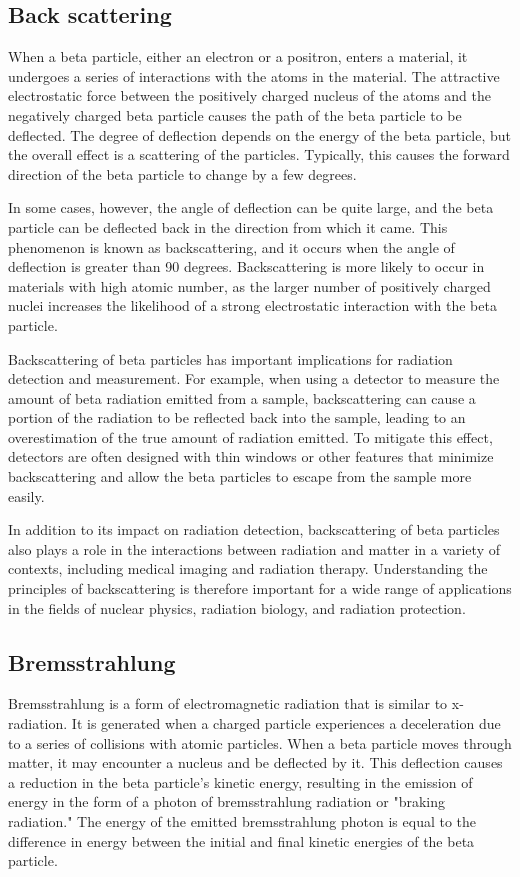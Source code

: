	\subsection{Back scattering}
		When a beta particle, either an electron or a positron, enters a material, it undergoes a series of interactions with the atoms in the material. The attractive electrostatic force between the positively charged nucleus of the atoms and the negatively charged beta particle causes the path of the beta particle to be deflected. The degree of deflection depends on the energy of the beta particle, but the overall effect is a scattering of the particles. Typically, this causes the forward direction of the beta particle to change by a few degrees.

		In some cases, however, the angle of deflection can be quite large, and the beta particle can be deflected back in the direction from which it came. This phenomenon is known as backscattering, and it occurs when the angle of deflection is greater than 90 degrees. Backscattering is more likely to occur in materials with high atomic number, as the larger number of positively charged nuclei increases the likelihood of a strong electrostatic interaction with the beta particle.
		
		Backscattering of beta particles has important implications for radiation detection and measurement. For example, when using a detector to measure the amount of beta radiation emitted from a sample, backscattering can cause a portion of the radiation to be reflected back into the sample, leading to an overestimation of the true amount of radiation emitted. To mitigate this effect, detectors are often designed with thin windows or other features that minimize backscattering and allow the beta particles to escape from the sample more easily.
		
		In addition to its impact on radiation detection, backscattering of beta particles also plays a role in the interactions between radiation and matter in a variety of contexts, including medical imaging and radiation therapy. Understanding the principles of backscattering is therefore important for a wide range of applications in the fields of nuclear physics, radiation biology, and radiation protection.
	\subsection{Bremsstrahlung}
		Bremsstrahlung is a form of electromagnetic radiation that is similar to x-radiation. It is generated when a charged particle experiences a deceleration due to a series of collisions with atomic particles. When a beta particle moves through matter, it may encounter a nucleus and be deflected by it. This deflection causes a reduction in the beta particle's kinetic energy, resulting in the emission of energy in the form of a photon of bremsstrahlung radiation or "braking radiation." The energy of the emitted bremsstrahlung photon is equal to the difference in energy between the initial and final kinetic energies of the beta particle.

